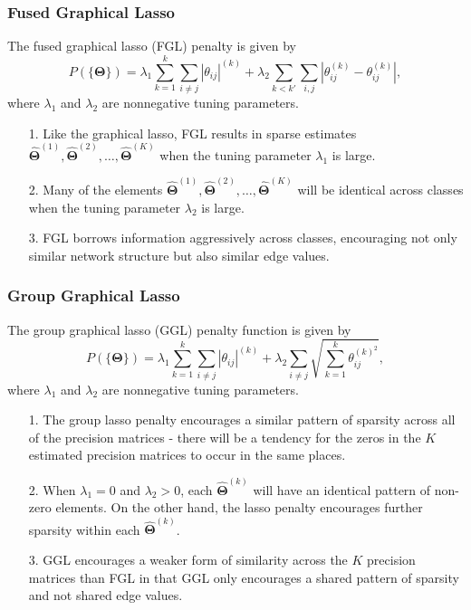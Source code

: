 \documentclass[t]{beamer}
\begin{document}
\begin{frame}
\frametitle{Fused Graphical Lasso}
The fused graphical lasso (FGL) penalty is given by
\small
\begin{equation*}
P(\{\bm{\Theta}\}) = \lambda_{1}\sum_{k=1}^{k}\sum_{i\neq j}|\theta_{ij}|^{(k)} + \lambda_{2}\sum_{k<k'}\sum_{i,j}|\theta_{ij}^{(k)}-\theta_{ij}^{(k)}|,
\end{equation*}
\normalsize
where $\lambda_{1}$ and $\lambda_{2}$ are nonnegative tuning parameters.

\bigskip
\pause
\begin{itemize}
	\item[1.] Like the graphical lasso, FGL results in sparse estimates $\hat{\bm{\Theta}}^{(1)},\hat{\bm{\Theta}}^{(2)},\ldots,\hat{\bm{\Theta}}^{(K)}$ when the tuning parameter $\lambda_{1}$ is large.
	
	\bigskip
	\pause
	\item[2.] Many of the elements $\hat{\bm{\Theta}}^{(1)},\hat{\bm{\Theta}}^{(2)},\ldots,\hat{\bm{\Theta}}^{(K)}$ will be identical across classes when the tuning parameter $\lambda_{2}$ is large.
	
	\bigskip
	\pause
	\item[3.] FGL borrows information aggressively across classes, encouraging not only similar network structure but also similar edge values.
\end{itemize}
\end{frame}

\begin{frame}
\frametitle{Group Graphical Lasso}
The group graphical lasso (GGL) penalty function is given by
\small
\begin{equation*}
P(\{\bm{\Theta}\}) = \lambda_{1}\sum_{k=1}^{k}\sum_{i\neq j}|\theta_{ij}|^{(k)} + \lambda_{2}\sum_{i\neq j}\sqrt{\sum_{k=1}^{k}\theta_{ij}^{(k)^{2}}},
\end{equation*}
\normalsize
where $\lambda_{1}$ and $\lambda_{2}$ are nonnegative tuning parameters.

\bigskip
\pause
\begin{itemize}
	\item[1.] The group lasso penalty encourages a similar pattern of sparsity across all of the precision matrices - there will be a tendency for the zeros in the $K$ estimated precision matrices to occur in the same places.
	
	\bigskip
	\pause
	\item[2.] When $\lambda_{1} = 0$ and $\lambda_{2} > 0$, each $\hat{\bm{\Theta}}^{(k)}$ will have an identical pattern of non-zero elements. On the other hand, the lasso penalty encourages further sparsity within each $\hat{\bm{\Theta}}^{(k)}$.
	
	\bigskip
	\pause
	\item[3.] GGL encourages a weaker form of similarity across the $K$ precision matrices than FGL in that GGL only encourages a shared pattern of sparsity and not shared edge values.
	\end{itemize}
\end{frame}
\end{document}
